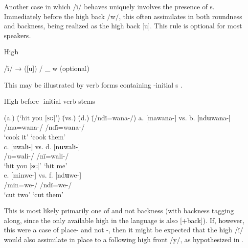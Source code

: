 
Another case in which /ï/ behaves uniquely involves the presence of s. Immediately before the high back  /w/, this  often  assimilates in both roundness and backness, being realized as the high back   [u]. This rule  is optional for most speakers.

\ea%
    \label{ex:phon:77}
          High  

    /ï/ → ([u]) / \_ w (optional)
\z

This  may be illustrated by verb forms containing -initial s .

\ea%
    \label{ex:phon:78}
          High   before -initial verb stems\\
\begin{tabbing}    
{(a.)} \= {(‘hit you [\textsc{sg}]’)} \= {(vs.)} \= {(d.)} \= {(/ndï=wana-/)}\kill
{a.} \> {[mawana-]} \> {vs.} \> {b.} \> {[nd\textbf{u}wana-]}\\
{ } \> {/ma=wana-/} \> { } \> { } \> {/ndï=wana-/}\\
{ } \> {‘cook it’} \> { } \> { } \> {‘cook them’}\\
{c.} \> {[uwali-]} \> {vs.} \> {d.} \> {[n\textbf{u}wali-]}\\
{ } \> {/u=wali-/} \> { } \> { } \> {/nï=wali-/}\\
{ } \> {‘hit you [\textsc{sg}]’} \> { } \> { } \> {‘hit me’}\\
{e.} \> {[minwe-]} \> {vs.} \> {f.} \> {[nd\textbf{u}we-]}\\
{ } \> {/min=we-/} \> { } \> { } \> {/ndï=we-/}\\
{ } \> {‘cut two’} \> { } \> { } \> {‘cut them’}
      \end{tabbing}
\z

This  is most likely primarily one of  and not backness (with backness tagging along, since the only available  high   in the language is also [+back]). If, however, this were a case of place- and not -, then it might be expected that the  high  /ï/ would also  assimilate in place to a following high front  /y/, as hypothesized in .

